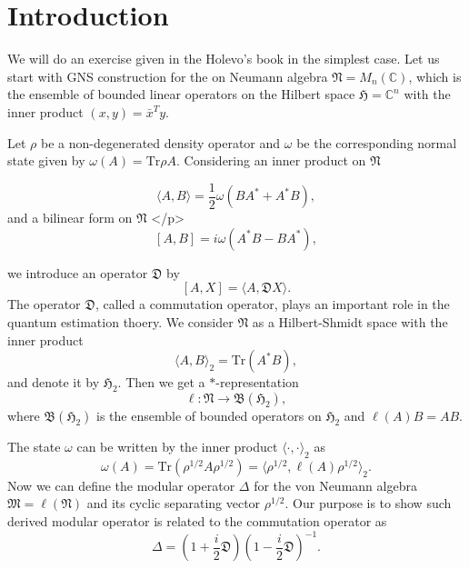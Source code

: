 \section{Introduction}
We will do an exercise given in the Holevo's book in the simplest case. 
Let us start with GNS construction for the 
on Neumann algebra $\mathfrak{N}=M_n(\mathbb{C})$, which is the ensemble of bounded linear operators on 
the Hilbert space $\mathfrak{H}=\mathbb{C}^n$ with the inner product $(x,y)=\bar{x}^Ty$. 
 
Let $\rho$ be a non-degenerated density operator and 
$\omega$ be the corresponding normal state given by $\omega(A)=\mbox{Tr}\rho A$.
Considering an inner product on $\mathfrak{N}$

\begin{equation}
\langle A, B \rangle =\frac{1}{2}\omega(BA^{\ast}+A^{\ast}B),
\end{equation}
and a bilinear form on $\mathfrak{N}$
</p>
$$
[A,B]=i\omega(A^{\ast}B-BA^{\ast}),
$$

we introduce an operator $\mathfrak{D}$ by 
$$
[A,X]=\langle A, \mathfrak{D}X\rangle.
$$
The operator $\mathfrak{D}$, called a commutation operator, plays an important role in the quantum estimation thoery.
We consider $\mathfrak{N}$ as a Hilbert-Shmidt space with the inner product
$$
\langle A, B \rangle_2 =\mbox{Tr}(A^{\ast}B),
$$
and denote it by $\mathfrak{H}_2$.
Then we get a $\ast$-representation 
$$
\ell :\mathfrak{N}\to \mathfrak{B}(\mathfrak{H}_2),
$$
where $\mathfrak{B}(\mathfrak{H}_2)$ is the ensemble of bounded operators on $\mathfrak{H}_2$
and $\ell(A)B=AB$.

The state $\omega$ can be written by the inner product $\langle \cdot, \cdot\rangle_2$ as 
$$
\omega(A)=\mbox{Tr}(\rho^{1/2}A\rho^{1/2})=\langle \rho^{1/2},\ell(A)\rho^{1/2}\rangle_2 .
$$
Now we can define the modular operator $\Delta$ for the von Neumann algebra $\mathfrak{M}=\ell(\mathfrak{N})$ and its cyclic separating vector $\rho^{1/2}$. 
Our purpose is to show such derived modular operator is related to the commutation operator
as
$$
    \Delta=\left(1+\frac{i}{2}\mathfrak{D}\right)\left(1-\frac{i}{2}\mathfrak{D}\right)^{-1}.
$$
